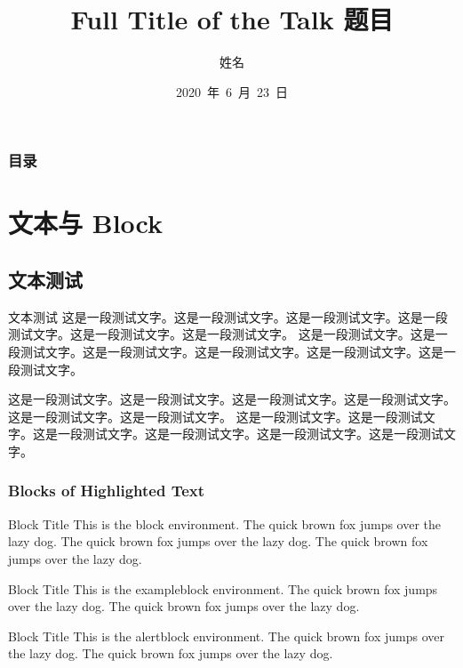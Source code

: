 \documentclass[notheorems]{beamer}
\title[Short 题目]{Full Title of the Talk 题目} %
\author{姓名}  %
\institute[NU] %
{
Name of University \\ %
\medskip
\textit{name@email.com} %
}
\date[2020.6.23]{2020~年~6~月~23~日} %
\theoremstyle{plain}
\numberwithin{theorem}{section}
\numberwithin{definition}{section}
\numberwithin{lemma}{section}
\numberwithin{proposition}{section}
\numberwithin{corollary}{section}
\theoremstyle{example}
\numberwithin{figure}{section}
\numberwithin{table}{section}
\numberwithin{equation}{section}
\begin{document}
\setlength{\baselineskip}{15pt}

\begin{frame}
\titlepage
\end{frame}

\begin{frame}
\frametitle{目录}
\tableofcontents%
\end{frame}


\section{文本与 Block}
\subsection{文本测试}

\begin{frame}{文本测试}
这是一段测试文字。这是一段测试文字。这是一段测试文字。这是一段测试文字。这是一段测试文字。这是一段测试文字。
这是一段测试文字。这是一段测试文字。这是一段测试文字。这是一段测试文字。这是一段测试文字。这是一段测试文字。

\vspace{1ex}
这是一段测试文字。这是一段测试文字。这是一段测试文字。这是一段测试文字。这是一段测试文字。这是一段测试文字。
这是一段测试文字。这是一段测试文字。这是一段测试文字。这是一段测试文字。这是一段测试文字。这是一段测试文字。

\end{frame}


\begin{frame}
\frametitle{Blocks of Highlighted Text}
\begin{block}{Block Title}
This is the block environment. The quick brown fox jumps over the lazy dog. The quick brown fox jumps over the lazy dog. The quick brown fox jumps over the lazy dog.
\end{block}

\begin{exampleblock}{Block Title}
This is the exampleblock environment. The quick brown fox jumps over the lazy dog. The quick brown fox jumps over the lazy dog.
\end{exampleblock}

\begin{alertblock}{Block Title}
This is the alertblock environment. The quick brown fox jumps over the lazy dog. The quick brown fox jumps over the lazy dog.
\end{alertblock}
\end{frame}
\end{document}
